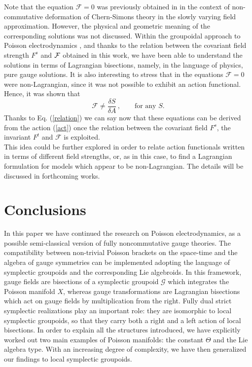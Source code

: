 \documentclass[12pt,a4paper]{article}
\numberwithin{equation}{section}
\theoremstyle{definition}
\newcommand{\cG}{\mathcal{G}}
\begin{document}
{Note that the equation ${\mathcal F}=0$ was previously obtained in \cite{Kupriyanov:2019cug} in the context of non-commutative deformation of Chern-Simons theory in the slowly varying field approximation. However, the physical and geometric meaning of the corresponding solutions was not discussed.
Within the groupoidal approach to Poisson electrodynamics \cite{Kupriyanov:2023qot,DiCosmo:2023wth}, and thanks to the relation between the covariant field strength  $F^s$ and ${\cal F}$ obtained in this work, we have been able to understand the solutions in terms of Lagrangian bisections, namely, in the language of physics, pure gauge solutions. 
It is also interesting to stress that in \cite{Kupriyanov:2019cug}  the equations ${\mathcal F}=0$ were  non-Lagrangian, since it was not possible to exhibit an action functional. Hence, it was shown that
\begin{equation*}
{\mathcal F}\neq\frac{\delta S}{\delta A}\,,\qquad \mbox{for any $S$}.
\end{equation*}
Thanks to Eq. (\ref{relation}) we can say now that  these equations can be derived  from the action (\ref{act}) once the relation between the covariant field $F^s$, the invariant $F^t$ and $\mathcal F$ is exploited.
\\
 This  idea could be further explored in order to relate  action functionals written in terms of different field strengths, or, as in this case, to find a Lagrangian formulation for models which appear to be non-Lagrangian. The details will be discussed in forthcoming works.

\section{Conclusions} 

In this paper we have continued the research on Poisson electrodynamics, as a possible semi-classical version of fully noncommutative gauge theories. The compatibility between  non-trivial Poisson brackets on the space-time and the algebra of gauge symmetries can be implemented adopting the language of symplectic groupoids and the corresponding Lie algebroids. In this framework, gauge fields are bisections of a symplectic groupoid $\cG$ which integrates the Poisson manifold $X$, whereas gauge transformations are Lagrangian bisections which act on gauge fields by multiplication from the right. 
Fully dual strict symplectic realizations play an important role: they are isomorphic to  local symplectic groupoids, so that they carry both a right and a left action of local bisections. In order to explain all the structures introduced, we have explicitly worked out two main examples of Poisson manifolds: the constant $\Theta$ and the Lie algebra type. With an increasing degree of complexity, we have then generalized our findings to local symplectic groupoids. 

}
\end{document}
